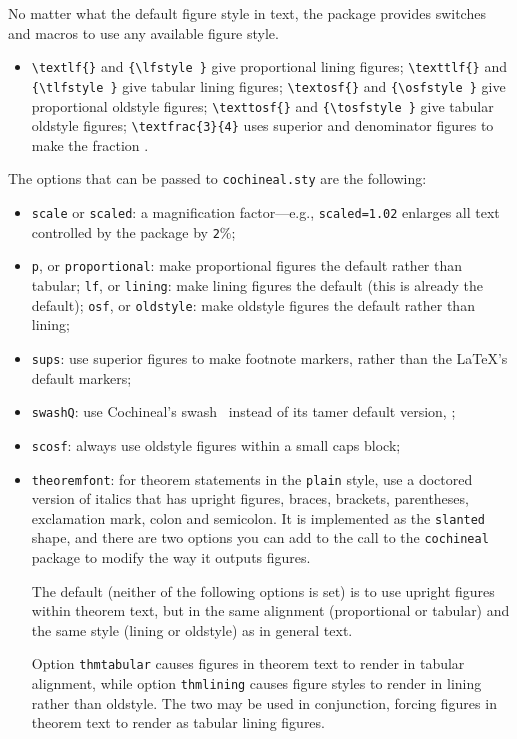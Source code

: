 \documentclass[11pt]{article}
\begin{document}
No matter what the default figure style in text, the package provides switches and macros to use any available figure style.
\begin{itemize}
\item
\verb|\textlf{}| and \verb|{\lfstyle }| give proportional lining figures;
\verb|\texttlf{}| and \verb|{\tlfstyle }| give tabular lining figures;
\verb|\textosf{}| and \verb|{\osfstyle }| give proportional oldstyle figures;
\verb|\texttosf{}| and \verb|{\tosfstyle }| give tabular oldstyle figures;
\verb|\textfrac{3}{4}| uses superior and denominator figures to make the fraction .
\end{itemize}
The options that can be passed to {\tt cochineal.sty} are the following:
\begin{itemize}
\item {\tt scale} or {\tt scaled}: a magnification factor---e.g., {\tt scaled=1.02} enlarges all text controlled by the package by {\tt2}\%;
\item
{\tt p}, or {\tt proportional}: make proportional figures the default rather than tabular;
{\tt lf}, or {\tt lining}: make lining figures the default (this is already the default);
{\tt osf}, or {\tt oldstyle}: make oldstyle figures the default rather than lining;
\item {\tt sups}: use superior figures to make footnote markers, rather than the \LaTeX's default markers;
\item {\tt swashQ}: use Cochineal's swash \Qswash\ instead of its tamer default version, \Qnoswash;
\item {\tt scosf}: always use oldstyle figures within a small caps block;
\item {\tt theoremfont}: for theorem statements in the {\tt plain} style, use a doctored version of italics that has upright figures, braces, brackets, parentheses, exclamation mark, colon and semicolon. It is implemented as the {\tt slanted} shape, and there are two options you can add to the call to the {\tt cochineal} package to modify the way it outputs figures.

The default (neither of the following options is set) is to use upright figures within theorem text, but in the same alignment (proportional or tabular) and the same style (lining or oldstyle) as in general text. 

Option {\tt thmtabular} causes figures in theorem text to render in tabular alignment, while option {\tt thmlining} causes figure styles to render in lining rather than oldstyle. The two may be used in conjunction, forcing figures  in theorem text to render as tabular lining figures.
\end{itemize}
\end{document}
